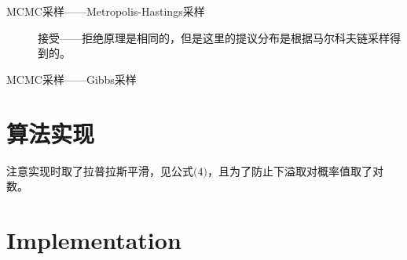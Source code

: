 \documentclass{ctexart}
\begin{document}
\begin{description}
\item[MCMC采样——Metropolis-Hastings采样]
接受——拒绝原理是相同的，但是这里的提议分布是根据马尔科夫链采样得到的。

\item[MCMC采样——Gibbs采样]



\end{description}





\section{算法实现}
%
%
注意实现时取了拉普拉斯平滑，见公式$\big(4\big)$，且为了防止下溢取对概率值取了对数。\cite{mcmc:Liu,stanf:cs229}
%
\section{Implementation}
\end{document}
